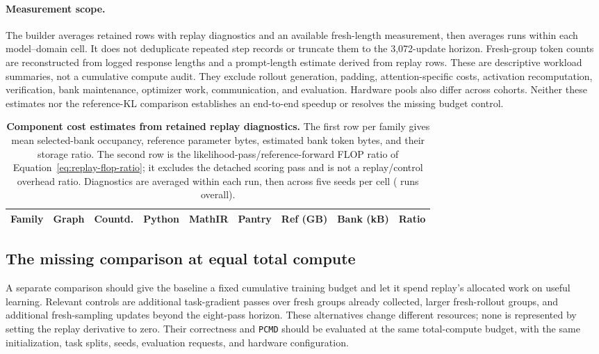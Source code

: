 \documentclass{article}
\newcommand{\1}{\mathbf 1}
\newcommand{\pmd}{\texttt{PCMD}}
\theoremstyle{remark}
\theoremstyle{definition}
\theoremstyle{plain}
\begin{document}
\paragraph{Measurement scope.}
The builder averages retained rows with replay diagnostics and an available
fresh-length measurement, then averages runs within each model--domain cell. It does not deduplicate repeated step
records or truncate them to the 3,072-update horizon. Fresh-group token
counts are reconstructed from logged response lengths and a prompt-length
estimate derived from replay rows. These are descriptive workload summaries,
not a cumulative compute audit. They exclude rollout generation, padding,
attention-specific costs, activation recomputation, verification, bank
maintenance, optimizer work, communication, and evaluation. Hardware pools
also differ across cohorts. Neither these estimates nor the reference-KL
comparison establishes an end-to-end speedup or resolves the missing budget
control.

\begin{table}[t]
  \centering
  \caption{\textbf{Component cost estimates from retained replay diagnostics.}
  The first row per family gives mean selected-bank occupancy, reference
  parameter bytes, estimated bank token bytes, and their storage ratio. The
  second row is the likelihood-pass/reference-forward FLOP ratio of
  Equation~\eqref{eq:replay-flop-ratio}; it excludes the detached scoring pass
  and is not a replay/control overhead ratio. Diagnostics are averaged within
  each run, then across five seeds per cell (\MDcostRuns{} runs overall).}
  \label{tab:replay-cost}
  \scriptsize
  \setlength{\tabcolsep}{4.2pt}
  \begin{tabular}{@{}lrrrrrrrr@{}}
    \toprule
    \textbf{Family} & \textbf{Graph} & \textbf{Countd.} & \textbf{Python}
      & \textbf{MathIR} & \textbf{Pantry} & \textbf{Ref (GB)}
      & \textbf{Bank (kB)} & \textbf{Ratio} \\
    \midrule
    
  \end{tabular}
\end{table}

\subsection{The missing comparison at equal total compute}
\label{app:compute-budget-control}

A separate comparison should give the baseline a fixed cumulative training
budget and let it spend replay's allocated work on useful learning. Relevant
controls are additional task-gradient passes over fresh groups already
collected, larger fresh-rollout groups, and additional fresh-sampling updates
beyond the eight-pass horizon. These alternatives change different resources;
none is represented by setting the replay derivative to zero. Their
correctness and \pmd{} should be evaluated at the same total-compute budget,
with the same initialization, task splits, seeds, evaluation requests, and
hardware configuration.
\end{document}
